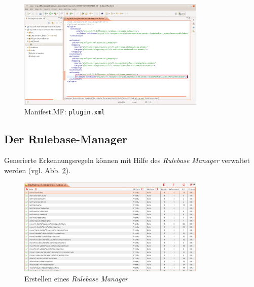 \documentclass[a4paper]{scrartcl}
\begin{document}
\begin{figure}[H]
\centering
\includegraphics[width=0.8\textwidth]{graphics/silift-Manifest_plugin.png}
\caption{Manifest.MF: \texttt{plugin.xml}}
\label{silift_Manifest_plugin}
\end{figure}



\subsection{Der Rulebase-Manager}
\label{sec:rbmanager}

Generierte Erkennungsregeln können mit Hilfe des \textit{Rulebase Manager} verwaltet werden (vgl. Abb. \ref{silif_Rulebase_Manager}).

\begin{figure}[H]
\centering
\includegraphics[width=0.8\textwidth]{graphics/silift-Rulebase_Manager.png}
\caption{Erstellen eines \textit{Rulebase Manager}}
\label{silif_Rulebase_Manager}
\end{figure}
\end{document}

